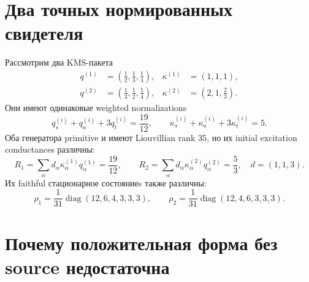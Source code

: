 \section{Два точных нормированных свидетеля}

Рассмотрим два KMS-пакета
\begin{equation}
 \begin{aligned}
 q^{(1)}&=\left(\frac12,\frac13,\frac14\right),
 &\kappa^{(1)}&=(1,1,1),\\
 q^{(2)}&=\left(\frac13,\frac12,\frac14\right),
 &\kappa^{(2)}&=\left(2,1,\frac23\right).
 \end{aligned}
 \label{eq:v9-kms-origin-two-witnesses}
\end{equation}
Они имеют одинаковые weighted normalizations
\begin{equation}
 q_s^{(i)}+q_a^{(i)}+3q_t^{(i)}=\frac{19}{12},
 \qquad
 \kappa_s^{(i)}+\kappa_a^{(i)}+3\kappa_t^{(i)}=5.
 \label{eq:v9-kms-origin-witness-normalizations}
\end{equation}
Оба генератора primitive и имеют Liouvillian rank $35$, но их initial
excitation conductances различны:
\begin{equation}
 R_1=\sum_\alpha d_\alpha\kappa_\alpha^{(1)}q_\alpha^{(1)}
 =\frac{19}{12},
 \qquad
 R_2=\sum_\alpha d_\alpha\kappa_\alpha^{(2)}q_\alpha^{(2)}
 =\frac53,
 \quad d=(1,1,3).
 \label{eq:v9-kms-origin-witness-rates}
\end{equation}
Их faithful стационарное состояниеs также различны:
\begin{equation}
 \rho_1=\frac1{31}\operatorname{diag}(12,6,4,3,3,3),
 \qquad
 \rho_2=\frac1{31}\operatorname{diag}(12,4,6,3,3,3).
 \label{eq:v9-kms-origin-witness-states}
\end{equation}

\section{Почему положительная форма без source недостаточна}

